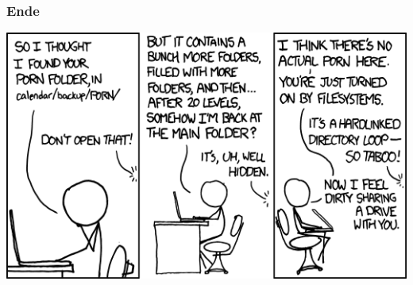 \documentclass{beamer}
\begin{document}
\begin{frame}
\frametitle{Ende}
\includegraphics[scale=0.4]{porn_folder.png}
\end{frame}
\end{document}
